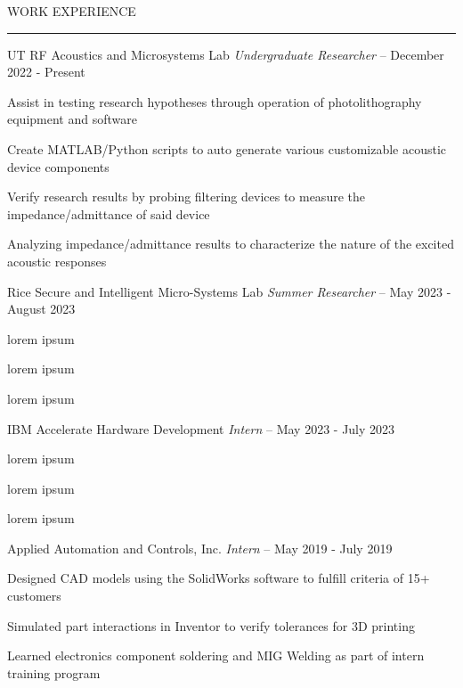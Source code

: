 \documentclass{resume} %
\renewenvironment{rSection}[1]{
\sectionskip
\textcolor{BurntOrange}{\MakeUppercase{#1}}
\sectionlineskip
\hrule
\begin{list}{}{
\setlength{\leftmargin}{0em}
}
\item[]
}{
\end{list}
}
\begin{document}
\begin{rSection}{Work Experience}

\begin{rSubsection}{UT RF Acoustics and Microsystems Lab \hfill \textit{Undergraduate Researcher} – December 2022 - Present} {}{}{}

\item Assist in testing research hypotheses through operation of photolithography equipment and software
\item Create MATLAB/Python scripts to auto generate various customizable acoustic device components 
\item Verify research results by probing filtering devices to measure the impedance/admittance of said device
\item Analyzing impedance/admittance results to characterize the nature of the excited acoustic responses
 
\end{rSubsection}  
 
\begin{rSubsection}{Rice Secure and Intelligent Micro-Systems Lab \hfill \textit{Summer Researcher} – May 2023 - August 2023} {}{}{}

\item lorem ipsum
\item lorem ipsum
\item lorem ipsum
 
\end{rSubsection}  

\begin{rSubsection}{IBM Accelerate Hardware Development \hfill \textit{Intern} – May 2023 - July 2023} {}{}{}

\item lorem ipsum
\item lorem ipsum
\item lorem ipsum
 
\end{rSubsection}  

\begin{rSubsection}{Applied Automation and Controls, Inc. \hfill \textit{Intern} – May 2019 - July 2019} {}{}{}

\item Designed CAD models using the SolidWorks software to fulfill criteria of 15+ customers
\item Simulated part interactions in Inventor to verify tolerances for 3D printing
\item Learned electronics component soldering and MIG Welding as part of intern training program 
 
\end{rSubsection}  


\end{rSection} 
\end{document}
